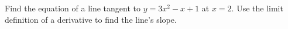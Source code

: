 Find the equation of a line tangent to $y=3x^2-x+1$ at $x=2$. Use the limit definition of a derivative to find the line's slope.

